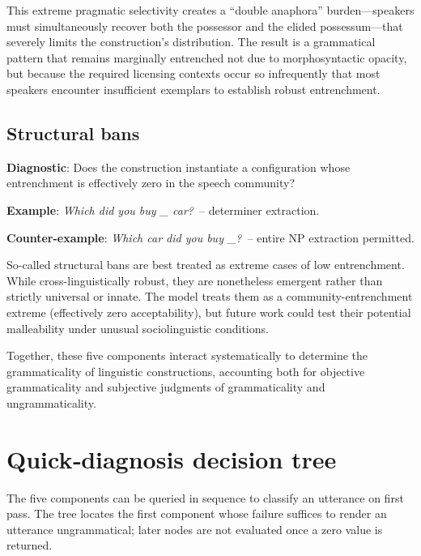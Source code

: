 \documentclass[12pt]{article}
\begin{document}
\label{ex:whose}
\z

This extreme pragmatic selectivity creates a \enquote{double anaphora} burden—speakers must simultaneously recover both the possessor and the elided possessum—that severely limits the construction's distribution. The result is a grammatical pattern that remains marginally entrenched not due to morphosyntactic opacity, but because the required licensing contexts occur so infrequently that most speakers encounter insufficient exemplars to establish robust entrenchment.

\subsection{Structural bans}

\begin{tcolorbox}[colback=lsLightBlue!30]
\textbf{Diagnostic}: Does the construction instantiate a configuration whose entrenchment is effectively zero in the speech community?

\textbf{Example}: \textit{\*Which did you buy \_ car?}~-- determiner extraction.

\textbf{Counter-example}: \textit{Which car did you buy \_?}~-- entire NP extraction permitted.
\end{tcolorbox}

So-called structural bans are best treated as extreme cases of low entrenchment. While cross-linguistically robust, they are nonetheless emergent rather than strictly universal or innate. The model treats them as a community-entrenchment extreme (effectively zero acceptability), but future work could test their potential malleability under unusual sociolinguistic conditions.

Together, these five components interact systematically to determine the grammaticality of linguistic constructions, accounting both for objective grammaticality and subjective judgments of grammaticality and ungrammaticality.


\section{Quick‑diagnosis decision tree}

The five components can be queried in sequence to classify an utterance on first pass. The tree locates the first component whose failure suffices to render an utterance ungrammatical; later nodes are not evaluated once a zero value is returned.
\end{document}
